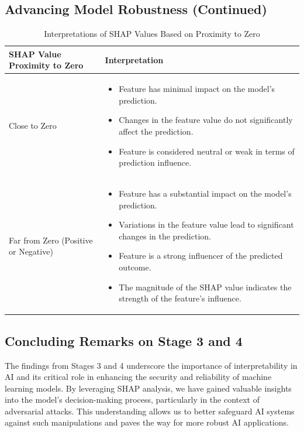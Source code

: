 \documentclass[10pt, conference, a4paper, final]{IEEEtran}
\begin{document}
    \subsection{Advancing Model Robustness (Continued)}

    \begin{table}[t]
        \centering
        \begin{tabular}{|p{3cm}|p{6cm}|}
        \hline
        \textbf{SHAP Value Proximity to Zero} & \textbf{Interpretation} \\ \hline
        Close to Zero & 
        \begin{itemize}
        \item Feature has minimal impact on the model's prediction.
        \item Changes in the feature value do not significantly affect the prediction.
        \item Feature is considered neutral or weak in terms of prediction influence.
        \end{itemize}
        \\ \hline
        Far from Zero (Positive or Negative) & 
        \begin{itemize}
        \item Feature has a substantial impact on the model's prediction.
        \item Variations in the feature value lead to significant changes in the prediction.
        \item Feature is a strong influencer of the predicted outcome.
        \item The magnitude of the SHAP value indicates the strength of the feature's influence.
        \end{itemize}
        \\ \hline
        \end{tabular}
        \caption{Interpretations of SHAP Values Based on Proximity to Zero}
        \label{table:shap-value-interpretation}
    \end{table}
    
    \subsection{Concluding Remarks on Stage 3 and 4}
    The findings from Stages 3 and 4 underscore the importance of interpretability in AI and its critical role in enhancing the security and reliability of machine learning models. By leveraging SHAP analysis, we have gained valuable insights into the model's decision-making process, particularly in the context of adversarial attacks. This understanding allows us to better safeguard AI systems against such manipulations and paves the way for more robust AI applications.
    
\end{document}
